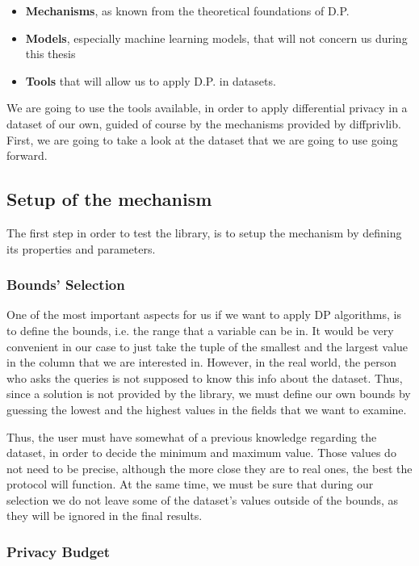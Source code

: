 \begin{itemize}
    \item \textbf{Mechanisms}, as known from the theoretical foundations of D.P.
    \item \textbf{Models}, especially machine learning models, that will not concern us during this thesis
    \item \textbf{Tools} that will allow us to apply D.P. in datasets.
\end{itemize}

We are going to use the tools available, in order to apply differential privacy in a dataset of our own, guided of course by the mechanisms provided by diffprivlib. First, we are going to take a look at the dataset that we are going to use going forward.


\subsection{Setup of the mechanism}

The first step in order to test the library, is to setup the mechanism by defining its properties and parameters. 

\subsubsection{Bounds' Selection}

One of the most important aspects for us if we want to apply DP algorithms, is to define the bounds, i.e. the range that a variable can be in. It would be very convenient in our case to just take the tuple of the smallest and the largest value in the column that we are interested in. However, in the real world, the person who asks the queries is not supposed to know this info about the dataset. Thus, since a solution is not provided by the library, we must define our own bounds by guessing the lowest and the highest values in the fields that we want to examine. 

Thus, the user must have somewhat of a previous knowledge regarding the dataset, in order to decide the minimum and maximum value. Those values do not need to be precise, although the more close they are to real ones, the best the protocol will function. At the same time, we must be sure that during our selection we do not leave some of the dataset's values outside of the bounds, as they will be ignored in the final results. 


\subsubsection{Privacy Budget}

